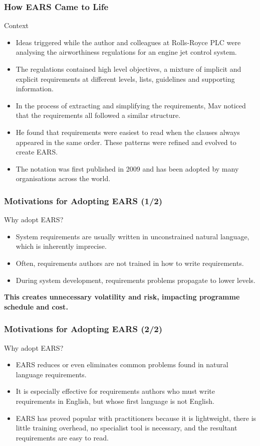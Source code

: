 \documentclass[aspectratio=169]{beamer}
\begin{document}
\begin{frame}
  \small
  \frametitle{How EARS Came to Life}
  \begin{block}{Context}
  \begin{itemize}
    \item Ideas triggered while the author and colleagues at Rolls-Royce PLC were analysing the airworthiness regulations for an engine jet control system. 
    \item The regulations contained high level objectives, a mixture of implicit and explicit requirements at different levels, lists, guidelines and supporting information.
    \item In the process of extracting and simplifying the requirements, Mav noticed that the requirements all followed a similar structure.
    \item He found that requirements were easiest to read when the clauses always appeared in the same order. These patterns were refined and evolved to create EARS.
    \item The notation was first published in 2009 and has been adopted by many organisations across the world.
  \end{itemize}
  \end{block}
  
\end{frame}

\begin{frame}
  \frametitle{Motivations for Adopting EARS (1/2)}
  \begin{block}{Why adopt EARS?}
  \begin{itemize}
  \item  System requirements are usually written in unconstrained natural language, which is inherently imprecise. 
  \item Often, requirements authors are not trained in how to write requirements. 
  \item During system development, requirements problems propagate to lower levels. 
  \end{itemize}
  {\bf This creates unnecessary volatility and risk, impacting programme schedule and cost.}
  \end{block} 
\end{frame}

\begin{frame}
  \frametitle{Motivations for Adopting EARS (2/2)}
  \begin{block}{Why adopt EARS?}
  \begin{itemize}
    \item EARS reduces or even eliminates common problems found in natural language requirements. 
    \item It is especially effective for requirements authors who must write requirements in English, but whose first language is not English. 
    \item EARS has proved popular with practitioners because it is lightweight, there is little training overhead, no specialist tool is necessary, and the resultant requirements are easy to read.
  \end{itemize}
  \end{block} 
\end{frame}
\end{document}
